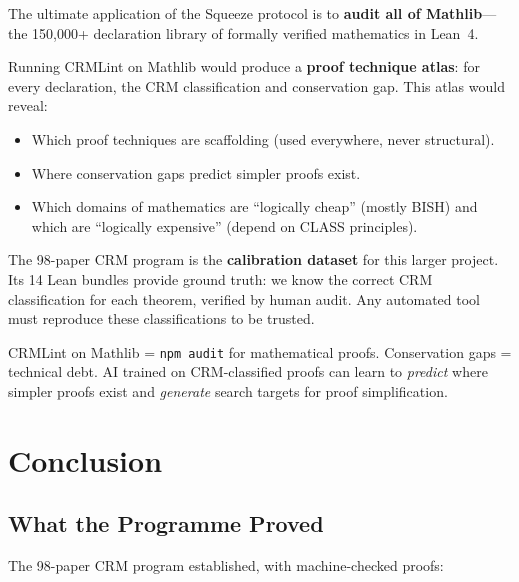 \documentclass[11pt,twoside,openany]{report}
\theoremstyle{remark}
\newcommand{\BISH}{\textsf{BISH}}
\newcommand{\CLASS}{\textsf{CLASS}}
\begin{document}
The ultimate application of the Squeeze protocol is to \textbf{audit all of Mathlib}---the 150,000+ declaration library of formally verified mathematics in Lean~4.

Running CRMLint on Mathlib would produce a \textbf{proof technique atlas}: for every declaration, the CRM classification and conservation gap. This atlas would reveal:
\begin{itemize}
  \item Which proof techniques are scaffolding (used everywhere, never structural).
  \item Where conservation gaps predict simpler proofs exist.
  \item Which domains of mathematics are ``logically cheap'' (mostly \BISH) and which are ``logically expensive'' (depend on \CLASS{} principles).
\end{itemize}

The 98-paper CRM program is the \textbf{calibration dataset} for this larger project. Its 14 Lean bundles provide ground truth: we know the correct CRM classification for each theorem, verified by human audit. Any automated tool must reproduce these classifications to be trusted.

\begin{thesisbox}
CRMLint on Mathlib = \texttt{npm audit} for mathematical proofs. Conservation gaps = technical debt. AI trained on CRM-classified proofs can learn to \emph{predict} where simpler proofs exist and \emph{generate} search targets for proof simplification.
\end{thesisbox}


\chapter{Conclusion}


\section{What the Programme Proved}

The 98-paper CRM program established, with machine-checked proofs:
\end{document}
